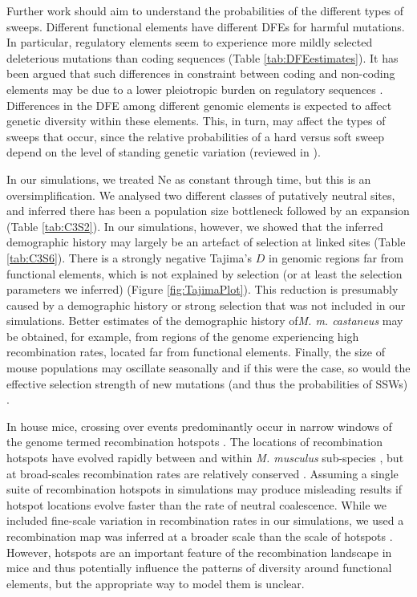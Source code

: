 	Further work should aim to understand the probabilities of the different types of sweeps. Different functional elements have different DFEs for harmful mutations. In particular, regulatory elements seem to experience more mildly selected deleterious mutations than coding sequences \citep{RN122, RN346} (Table \ref{tab:DFEestimates}). It has been argued that such differences in constraint between coding and non-coding elements may be due to a lower pleiotropic burden on regulatory sequences \citep{RN346}. Differences in the DFE among different genomic elements is expected to affect genetic diversity within these elements. This, in turn, may affect the types of sweeps that occur, since the relative probabilities of a hard versus soft sweep depend on the level of standing genetic variation (reviewed in \cite{RN336}). 

	In our simulations, we treated Ne as constant through time, but this is an oversimplification. We analysed two different classes of putatively neutral sites, and inferred there has been a population size bottleneck followed by an expansion (Table \ref{tab:C3S2}). In our simulations, however, we showed that the inferred demographic history may largely be an artefact of selection at linked sites (Table \ref{tab:C3S6}). There is a strongly negative Tajima’s $D$ in genomic regions far from functional elements, which is not explained by selection (or at least the selection parameters we inferred) (Figure \ref{fig:TajimaPlot}). This reduction is presumably caused by a demographic history or strong selection that was not included in our simulations. Better estimates of the demographic history of\textit{M. m. castaneus} may be obtained, for example, from regions of the genome experiencing high recombination rates, located far from functional elements. Finally, the size of mouse populations may oscillate seasonally \citep{RN392} and if this were the case, so would the effective selection strength of new mutations (and thus the probabilities of SSWs) \citep{RN350}. 

	In house mice, crossing over events predominantly occur in narrow windows of the genome termed recombination hotspots \cite{RN254}. The locations of recombination hotspots have evolved rapidly between and within \textit{M. musculus} sub-species \citep{RN249}, but at broad-scales recombination rates are relatively conserved \citep{RN340}. Assuming a single suite of recombination hotspots in simulations may produce misleading results if hotspot locations evolve faster than the rate of neutral coalescence. While we included fine-scale variation in recombination rates in our simulations, we used a recombination map was inferred at a broader scale than the scale of hotspots \citep{RN340}. However, hotspots are an important feature of the recombination landscape in mice and thus potentially influence the patterns of diversity around functional elements, but the appropriate way to model them is unclear.


